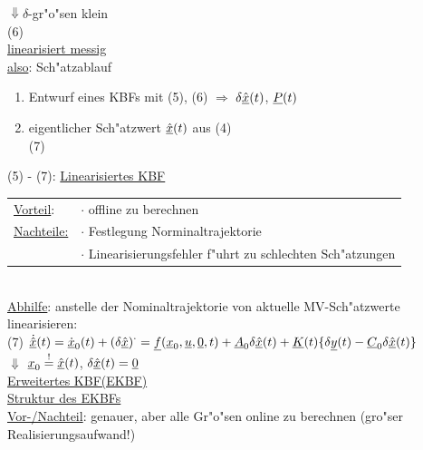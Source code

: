 \documentclass[openany,a4paper,11pt]{book}
\begin{document}
$\Downarrow \delta$-gr"o"sen klein\\
 \quad (6)\\
\uline{linearisiert messig}\\
\uline{also}: Sch"atzablauf \begin{enumerate}
    \item Entwurf eines KBFs mit (5), (6) $\Rightarrow$ $\delta \uline{\hat{x}}(t)$, $\uline{P}(t)$ 
    \item eigentlicher Sch"atzwert $\uline{\hat{x}}(t)$ aus (4) \\
     \quad (7)
\end{enumerate}
(5) - (7): \uline{Linearisiertes KBF} \\ 
\begin{tabular}{ll}
    \uline{Vorteil}: & $\cdot$ offline zu berechnen\\
    \uline{Nachteile:} & $\cdot$ Festlegung Norminaltrajektorie\\
    & $\cdot$ Linearisierungsfehler f"uhrt zu schlechten Sch"atzungen\\
\end{tabular}\\
\uline{Abhilfe}: anstelle der Nominaltrajektorie von aktuelle MV-Sch"atzwerte linearisieren:\\[3pt]
(7) $\displaystyle\uline{\dot{\hat{x}}}(t)=\uline{\dot{x}}_0(t)+(\delta\uline{\hat{x}})^\cdot=\uline{f}(\uline{x}_0,\uline{u},\uline{0},t)+\uline{A}_0\delta\uline{\hat{x}}(t)+\uline{K}(t)\{\delta\uline{y}(t)-\uline{C}_0\delta\uline{\hat{x}}(t)\}$\\
$\Downarrow$ $\uline{x}_0\stackrel{!}{=}\uline{\hat{x}}(t)$, $\delta\uline{\hat{x}}(t)=\uline{0}$\\
\uline{Erweitertes KBF(EKBF)} \\
\uline{Struktur des EKBFs} \\
\uline{Vor-/Nachteil}: genauer, aber alle Gr"o"sen online zu berechnen (gro"ser Realisierungsaufwand!)\\

\end{document}
